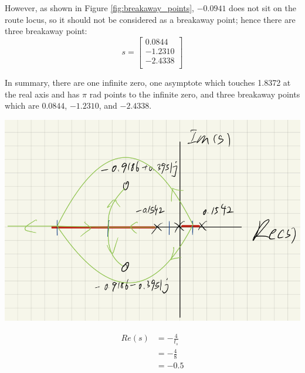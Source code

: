 \begin{questions}
\begin{solution}
   However, as shown in Figure \ref{fig:breakaway_points}, $-0.0941$ does not sit on the route locus, so it should not be considered as a breakaway point; hence there are three breakaway point:
   \begin{equation*}
   s =
   \begin{bmatrix}
    0.0844 \\
   -1.2310 \\
   -2.4338 \\
   \end{bmatrix}
   \end{equation*}

   In summary, there are one infinite zero, one asymptote which touches 1.8372 at the real axis and has $\pi$ rad points to the infinite zero, and three breakaway points which are $0.0844$, $-1.2310$, and $-2.4338$.


   \begin{minipage}[htbp]{\linewidth}
      \centering
      \includegraphics[scale=0.62]{figures/root_locus.png}
   \end{minipage}


   \begin{equation}\label{eq:Re(s)}
   \begin{split}
   Re(s) &= -\frac{4}{t_s} \\
   &= -\frac{4}{8} \\
   &= -0.5
   \end{split}
   \end{equation}


\end{solution}
\end{questions}

